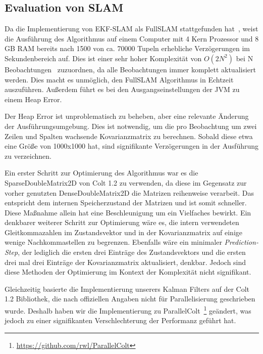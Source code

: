\documentclass[11pt]{article}
\begin{document}
\subsection{Evaluation von SLAM}\label{SLAM-Evaluation}
Da die Implementierung von EKF-SLAM als FullSLAM stattgefunden hat~\cite{Freiburg_SLAM_Formeln}, weist die Ausführung des Algorithmus auf einem Computer mit 4 Kern Prozessor und 8 GB RAM bereits nach 1500 von ca. 70000 Tupeln erhebliche Verzögerungen im Sekundenbereich auf. Dies ist einer sehr hoher Komplexität von $O(2N^2)$ bei N Beobachtungen~\cite{ute_SLAM} zuzuordnen, da alle Beobachtungen immer komplett aktualisiert werden. Dies macht es unmöglich, den FullSLAM Algorithmus in Echtzeit auszuführen. Außerdem führt es bei den Ausgangseinstellungen der JVM zu einem Heap Error.

Der Heap Error ist unproblematisch zu beheben, aber eine relevante Änderung der Ausführungsumgebung. Dies ist notwendig, um die pro Beobachtung um zwei Zeilen und Spalten wachsende Kovarianzmatrix zu berechnen. Sobald diese etwa eine Größe von 1000x1000 hat, sind signifikante Verzögerungen in der Ausführung zu verzeichnen.

Ein erster Schritt zur Optimierung des Algorithmus war es die SparseDoubleMatrix2D von Colt 1.2 zu verwenden, da diese im Gegensatz zur vorher genutzten DenseDoubleMatrix2D die Matrizen reihenweise verarbeit. Das entspricht dem internen Speicherzustand der Matrizen und ist somit schneller. Diese Maßnahme allein hat eine Beschleunigung um ein Vielfaches bewirkt. Ein denkbarer weiterer Schritt zur Optimierung wäre es, die intern verwendeten Gleitkommazahlen im Zustandsvektor und in der Kovarianzmatrix auf einige wenige Nachkommastellen zu begrenzen. Ebenfalls wäre ein minimaler \textit{Prediction-Step}, der lediglich die ersten drei Einträge des Zustandsvektors und die ersten drei mal drei Einträge der Kovarianzmatrix aktualisiert, denkbar. Jedoch sind diese Methoden der Optimierung im Kontext der Komplexität nicht signifikant.

Gleichzeitig basierte die Implementierung unserers Kalman Filters auf der Colt 1.2 Bibliothek, die nach offiziellen Angaben nicht für Parallelisierung geschrieben wurde. Deshalb haben wir die Implementierung zu ParallelColt~\footnote{\url{https://github.com/rwl/ParallelColt}} geändert, was jedoch zu einer signifikanten Verschlechterung der Performanz geführt hat.
\end{document}

